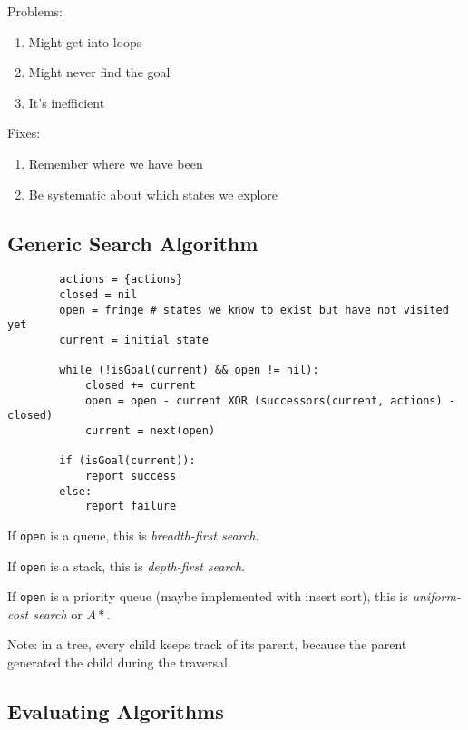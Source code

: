 \documentclass[english,openany]{book}
\begin{document}
    Problems:

    \begin{enumerate}[label=(\Alph*)]
        \item Might get into loops
        \item Might never find the goal
        \item It's inefficient
    \end{enumerate}

    Fixes:

    \begin{enumerate}[label=(\Alph*)]
        \item Remember where we have been
        \item Be systematic about which states we explore
    \end{enumerate}

    \newpage
    \subsection{Generic Search Algorithm}

    \begin{lstlisting}
        actions = {actions}
        closed = nil
        open = fringe # states we know to exist but have not visited yet
        current = initial_state

        while (!isGoal(current) && open != nil):
            closed += current
            open = open - current XOR (successors(current, actions) - closed)
            current = next(open)

        if (isGoal(current)):
            report success
        else:
            report failure
    \end{lstlisting}

    If \texttt{open} is a queue, this is \textit{breadth-first search}.

    If \texttt{open} is a stack, this is \textit{depth-first search}.

    If \texttt{open} is a priority queue (maybe implemented with insert sort), this is \textit{uniform-cost search} or $A*$.

    Note: in a tree, every child keeps track of its parent, because the parent generated the child during the traversal.

    \subsection{Evaluating Algorithms}
\end{document}
